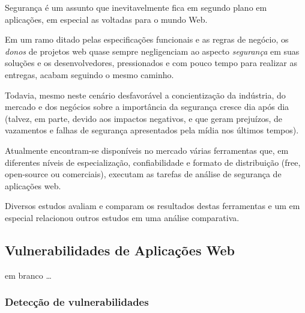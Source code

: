 \documentclass[twocolumn,showpacs,%
  nofootinbib,aps,superscriptaddress,%
  eqsecnum,prd,notitlepage,showkeys,10pt]{revtex4-1}
\begin{document}
Segurança é um assunto que inevitavelmente fica em segundo plano em aplicações, em especial as voltadas para o mundo Web.

Em um ramo ditado pelas especificações funcionais e as regras de negócio, os \emph{donos} de projetos web quase sempre negligenciam ao aspecto \emph{segurança} em suas soluções e os desenvolvedores, pressionados e com pouco tempo para realizar as entregas, acabam seguindo o mesmo caminho.

Todavia, mesmo neste cenário desfavorável a concientização da indústria, do mercado e dos negócios sobre a importância da segurança cresce dia após dia (talvez, em parte, devido aos impactos negativos, e que geram prejuízos, de vazamentos e falhas de segurança apresentados pela mídia nos últimos tempos).

Atualmente encontram-se disponíveis no mercado várias ferramentas que, em diferentes níveis de especialização, confiabilidade e formato de distribuição (free, open-source ou comerciais), executam as tarefas de análise de segurança de aplicações web.

Diversos estudos avaliam e comparam os resultados destas ferramentas e um em especial \cite{metwas} relacionou outros estudos em uma análise comparativa.
 







\subsection{Vulnerabilidades de Aplicações Web}

em branco \dots

\subsubsection{Detecção de vulnerabilidades}
\end{document}
